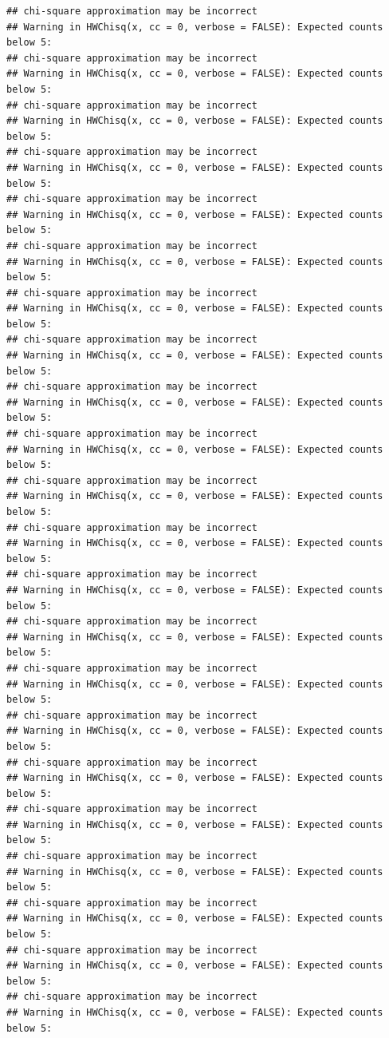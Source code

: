 \documentclass[
]{article}
\begin{document}
\begin{verbatim}
## chi-square approximation may be incorrect
## Warning in HWChisq(x, cc = 0, verbose = FALSE): Expected counts below 5:
## chi-square approximation may be incorrect
## Warning in HWChisq(x, cc = 0, verbose = FALSE): Expected counts below 5:
## chi-square approximation may be incorrect
## Warning in HWChisq(x, cc = 0, verbose = FALSE): Expected counts below 5:
## chi-square approximation may be incorrect
## Warning in HWChisq(x, cc = 0, verbose = FALSE): Expected counts below 5:
## chi-square approximation may be incorrect
## Warning in HWChisq(x, cc = 0, verbose = FALSE): Expected counts below 5:
## chi-square approximation may be incorrect
## Warning in HWChisq(x, cc = 0, verbose = FALSE): Expected counts below 5:
## chi-square approximation may be incorrect
## Warning in HWChisq(x, cc = 0, verbose = FALSE): Expected counts below 5:
## chi-square approximation may be incorrect
## Warning in HWChisq(x, cc = 0, verbose = FALSE): Expected counts below 5:
## chi-square approximation may be incorrect
## Warning in HWChisq(x, cc = 0, verbose = FALSE): Expected counts below 5:
## chi-square approximation may be incorrect
## Warning in HWChisq(x, cc = 0, verbose = FALSE): Expected counts below 5:
## chi-square approximation may be incorrect
## Warning in HWChisq(x, cc = 0, verbose = FALSE): Expected counts below 5:
## chi-square approximation may be incorrect
## Warning in HWChisq(x, cc = 0, verbose = FALSE): Expected counts below 5:
## chi-square approximation may be incorrect
## Warning in HWChisq(x, cc = 0, verbose = FALSE): Expected counts below 5:
## chi-square approximation may be incorrect
## Warning in HWChisq(x, cc = 0, verbose = FALSE): Expected counts below 5:
## chi-square approximation may be incorrect
## Warning in HWChisq(x, cc = 0, verbose = FALSE): Expected counts below 5:
## chi-square approximation may be incorrect
## Warning in HWChisq(x, cc = 0, verbose = FALSE): Expected counts below 5:
## chi-square approximation may be incorrect
## Warning in HWChisq(x, cc = 0, verbose = FALSE): Expected counts below 5:
## chi-square approximation may be incorrect
## Warning in HWChisq(x, cc = 0, verbose = FALSE): Expected counts below 5:
## chi-square approximation may be incorrect
## Warning in HWChisq(x, cc = 0, verbose = FALSE): Expected counts below 5:
## chi-square approximation may be incorrect
## Warning in HWChisq(x, cc = 0, verbose = FALSE): Expected counts below 5:
## chi-square approximation may be incorrect
## Warning in HWChisq(x, cc = 0, verbose = FALSE): Expected counts below 5:
## chi-square approximation may be incorrect
## Warning in HWChisq(x, cc = 0, verbose = FALSE): Expected counts below 5:

\end{verbatim}
\end{document}
